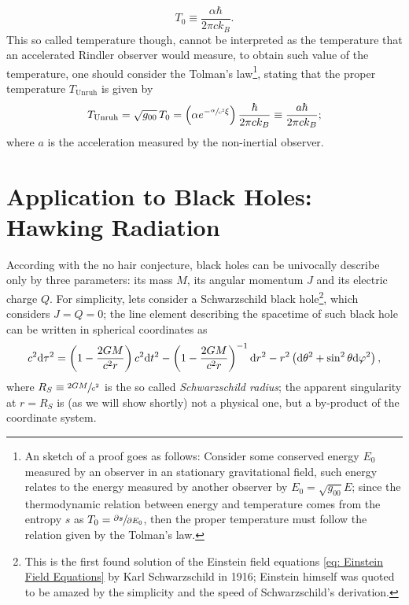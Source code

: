\begin{equation}\label{eq: Unruh temp_0}
	T_0\equiv \frac{\alpha\hbar}{2\pi ck_B}.
\end{equation}
This so called temperature though, cannot be interpreted as the temperature that an accelerated Rindler observer would measure, to obtain such value of the temperature, one should consider the Tolman's law\footnote{An sketch of a proof goes as follows: Consider some conserved energy $E_0$ measured by an observer in an stationary gravitational field, such energy relates to the energy measured by another observer by $E_0=\sqrt{g_{00}}E$; since the thermodynamic relation between energy and temperature comes from the entropy $s$ as $T_0=\sfrac{\partial s}{\partial E_0}$, then the proper temperature must follow the relation given by the Tolman's law.}, stating that the proper temperature $T_{\text{Unruh}}$ is given by
\begin{equation}
	T_{\text{Unruh}}=\sqrt{g_{00}}\,T_0=\left(\alpha e^{-\sfrac{\alpha}{c^2}\xi}\right)\frac{\hbar}{2\pi ck_B}\equiv \frac{a\hbar}{2\pi ck_B};
\end{equation}
where $a$ is the acceleration measured by the non-inertial observer.

\section{Application to Black Holes: Hawking Radiation}
According with the no hair conjecture, black holes can be univocally describe only by three parameters: its mass $M$, its angular momentum $J$ and its electric charge $Q$. For simplicity, lets consider a Schwarzschild black hole\footnote{This is the first found solution of the Einstein field equations \ref{eq: Einstein Field Equations} by Karl Schwarzschild in 1916; Einstein himself was quoted to be amazed by the simplicity and the speed of Schwarzschild's derivation.}, which considers $J=Q=0$; the line element describing the spacetime of such black hole can be written in spherical coordinates as
\begin{equation}\label{eq: Schwarzschild line element}
	c^2\text{d}\tau^2=\left(1-\frac{2GM}{c^2r}\right)c^2\text{d} t^2-\left(1-\frac{2GM}{c^2r}\right)^{-1}\text{d} r^2-r^2\left(\text{d}\theta^2+\sin^2\theta\text{d}\varphi^2\right),
\end{equation}
where $R_S\equiv\sfrac{2GM}{c^2}$ is the so called \textit{Schwarzschild radius}; the apparent singularity at $r=R_S$ is (as we will show shortly) not a physical one, but a by-product of the coordinate system.

